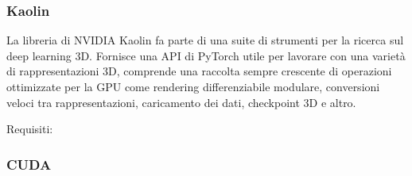 \medskip

\subsubsection{Kaolin}

La libreria di NVIDIA Kaolin fa parte di una suite di strumenti per la ricerca sul deep learning 3D. Fornisce una API di PyTorch utile per lavorare con una varietà di rappresentazioni 3D, comprende una raccolta sempre crescente di operazioni ottimizzate per la GPU come rendering differenziabile modulare, conversioni veloci tra rappresentazioni, caricamento dei dati, checkpoint 3D e altro.


\medskip

Requisiti:


\newpage


\subsubsection{CUDA}

\medskip






\medskip

